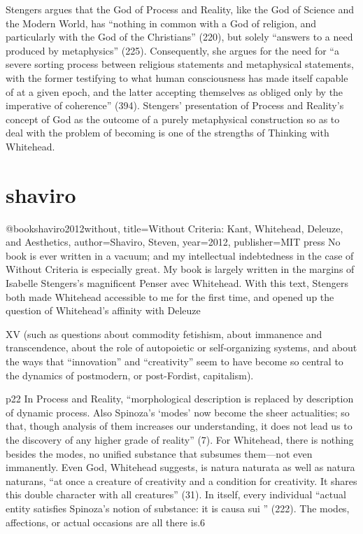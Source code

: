 Stengers
argues that the God of Process and Reality, like the God of Science and the Modern
World, has “nothing in common with a God of religion, and particularly with the God
of the Christians” (220), but solely “answers to a need produced by metaphysics”
(225). Consequently, she argues for the need for “a severe sorting process between
religious statements and metaphysical statements, with the former testifying to what
human consciousness has made itself capable of at a given epoch, and the latter
accepting themselves as obliged only by the imperative of coherence” (394).
Stengers’ presentation of Process and Reality’s concept of God as the outcome of a
purely metaphysical construction so as to deal with the problem of becoming is one of
the strengths of Thinking with Whitehead.

\section{shaviro}
@book{shaviro2012without,
	title={Without Criteria: Kant, Whitehead, Deleuze, and Aesthetics},
	author={Shaviro, Steven},
	year={2012},
	publisher={MIT press}
}
No book is ever written in a vacuum; and my intellectual indebtedness
in the case of Without Criteria is especially great. My book is largely written in
the margins of Isabelle Stengers’s magnificent Penser avec Whitehead. With this
text, Stengers both made Whitehead accessible to me for the first time, and
opened up the question of Whitehead’s affinity with Deleuze

XV
(such as questions about commodity fetishism, about immanence
and transcendence, about the role of autopoietic or self-organizing systems,
and about the ways that “innovation” and “creativity” seem to have
become so central to the dynamics of postmodern, or post-Fordist, capitalism).

p22
In Process and Reality, “morphological description is replaced by
description of dynamic process. Also Spinoza’s ‘modes’ now become the
sheer actualities; so that, though analysis of them increases our understanding,
it does not lead us to the discovery of any higher grade of reality” (7).
For Whitehead, there is nothing besides the modes, no unified substance
that subsumes them—not even immanently. Even God, Whitehead suggests,
is natura naturata as well as natura naturans, “at once a creature of creativity
and a condition for creativity. It shares this double character with all creatures”
(31). In itself, every individual “actual entity satisfies Spinoza’s notion
of substance: it is causa sui ” (222). The modes, affections, or actual occasions
are all there is.6

